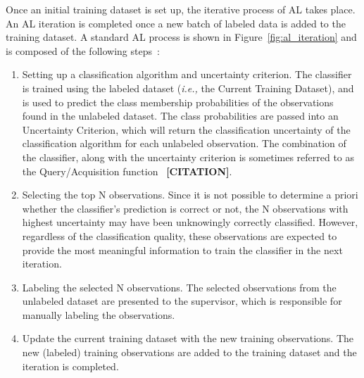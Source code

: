 \documentclass[parskip=full]{scrartcl}
\begin{document}
Once an initial training dataset is set up, the iterative process of AL takes
place. An AL iteration is completed once a new batch of labeled data is added
to the training dataset. A standard AL process is shown in
Figure~\ref{fig:al_iteration} and is composed of the following
steps~\cite{Su2020, Sverchkov2017}:

\begin{enumerate}

    \item Setting up a classification algorithm and uncertainty criterion. The
        classifier is trained using the labeled dataset (\textit{i.e.,} the
        Current Training Dataset), and is used to predict the class membership
        probabilities of the observations found in the unlabeled dataset. The
        class probabilities are passed into an Uncertainty Criterion, which
        will return the classification uncertainty of the classification
        algorithm for each unlabeled observation. The combination of the
        classifier, along with the uncertainty criterion is sometimes referred
        to as the Query/Acquisition function~\cite{Rosario2020} \textbf{[CITATION]}.

    \item Selecting the top N observations. Since it is not possible to
        determine a priori whether the classifier's prediction is correct or
        not, the N observations with highest uncertainty may have been
        unknowingly correctly classified. However, regardless of the
        classification quality, these observations are expected to provide the
        most meaningful information to train the classifier in the next
        iteration.

    \item Labeling the selected N observations. The selected observations from
        the unlabeled dataset are presented to the supervisor, which is
        responsible for manually labeling the observations.

    \item Update the current training dataset with the new training
        observations. The new (labeled) training observations are added to the
        training dataset and the iteration is completed.

\end{enumerate}
\end{document}
